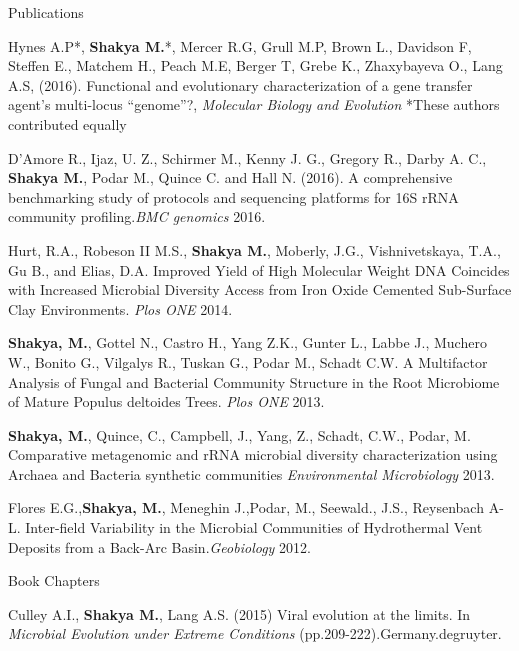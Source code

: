 \documentclass{resume} %
\begin{document}

\begin{rSection}{Publications}
\item Hynes A.P*, \textbf{Shakya M.}*, Mercer R.G, Grull M.P, Brown L., Davidson F, Steffen E., Matchem H., Peach M.E, Berger T, Grebe K., Zhaxybayeva O., Lang A.S, (2016). Functional and evolutionary characterization of a gene transfer agent's multi-locus ``genome''?, \textit{Molecular Biology and Evolution} *{\tiny These authors contributed equally}
\item D’Amore R., Ijaz, U. Z., Schirmer M., Kenny J. G., Gregory R., Darby A. C., \textbf{Shakya M.}, Podar M., Quince C. and Hall N. (2016). A comprehensive benchmarking study of protocols and sequencing platforms for 16S rRNA community profiling.\textit{BMC genomics} 2016. 
\item Hurt, R.A., Robeson II M.S., \textbf{Shakya M.}, Moberly, J.G., Vishnivetskaya, T.A., Gu B., and Elias, D.A. Improved Yield of High Molecular Weight DNA Coincides with Increased Microbial Diversity Access from Iron Oxide Cemented Sub-Surface Clay Environments. \textit{Plos ONE} 2014. 
 \item \textbf{Shakya, M.}, Gottel N., Castro H., Yang Z.K., Gunter L., Labbe J., Muchero W., Bonito G., Vilgalys R., Tuskan G., Podar M., Schadt C.W. A Multifactor Analysis of Fungal and Bacterial Community Structure in the Root Microbiome of Mature Populus deltoides Trees. \textit{Plos ONE} 2013. 
\item \textbf{Shakya, M.}, Quince, C., Campbell, J., Yang, Z., Schadt, C.W., Podar, M. Comparative metagenomic and rRNA microbial diversity characterization using Archaea and Bacteria synthetic communities \textit{Environmental Microbiology} 2013.
\item Flores E.G.,\textbf{Shakya, M.}, Meneghin J.,Podar, M., Seewald., J.S., Reysenbach A-L. Inter-field Variability in the Microbial Communities of Hydrothermal Vent Deposits from a Back-Arc Basin.\textit{Geobiology} 2012. 
\end{rSection}

\begin{rSection}{Book Chapters}
\item Culley A.I., \textbf{Shakya M.}, Lang A.S. (2015) Viral evolution at the limits. In \textit{Microbial Evolution under Extreme Conditions} (pp.209-222).Germany.degruyter.
\end{rSection}
\end{document}

